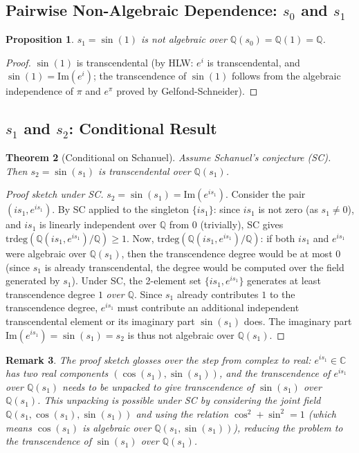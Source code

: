 \documentclass[11pt]{article}
\newtheorem{theorem}{Theorem}
\newtheorem{proposition}[theorem]{Proposition}
\newtheorem{remark}[theorem]{Remark}
\begin{document}
\subsection{Pairwise Non-Algebraic Dependence: $s_0$ and $s_1$}

\begin{proposition}
$s_1=\sin(1)$ is not algebraic over $\mathbb{Q}(s_0)=\mathbb{Q}(1)=\mathbb{Q}$.
\end{proposition}

\begin{proof}
$\sin(1)$ is transcendental (by HLW: $e^i$ is transcendental, and $\sin(1)=\mathrm{Im}(e^i)$;
the transcendence of $\sin(1)$ follows from the algebraic independence of
$\pi$ and $e^\pi$ proved by Gelfond-Schneider).
\end{proof}

\subsection{$s_1$ and $s_2$: Conditional Result}

\begin{theorem}[Conditional on Schanuel]
\label{thm:s1s2}
Assume Schanuel's conjecture (SC). Then $s_2=\sin(s_1)$ is transcendental over $\mathbb{Q}(s_1)$.
\end{theorem}

\begin{proof}[Proof sketch under SC]
$s_2=\sin(s_1)=\mathrm{Im}(e^{is_1})$.
Consider the pair $(is_1, e^{is_1})$. By SC applied to the singleton $\{is_1\}$:
since $is_1$ is not zero (as $s_1\neq0$), and $is_1$ is linearly independent over $\mathbb{Q}$
from $0$ (trivially), SC gives $\mathrm{trdeg}(\mathbb{Q}(is_1, e^{is_1})/\mathbb{Q})\geq1$.
Now, $\mathrm{trdeg}(\mathbb{Q}(is_1, e^{is_1})/\mathbb{Q})$:
if both $is_1$ and $e^{is_1}$ were algebraic over $\mathbb{Q}(s_1)$, then the transcendence
degree would be at most $0$ (since $s_1$ is already transcendental, the degree would be
computed over the field generated by $s_1$). Under SC, the 2-element set $\{is_1, e^{is_1}\}$
generates at least transcendence degree $1$ \emph{over $\mathbb{Q}$}. Since $s_1$
already contributes $1$ to the transcendence degree, $e^{is_1}$ must contribute an
additional independent transcendental element or its imaginary part $\sin(s_1)$ does.
The imaginary part $\mathrm{Im}(e^{is_1})=\sin(s_1)=s_2$ is thus not algebraic over $\mathbb{Q}(s_1)$.
\end{proof}

\begin{remark}
The proof sketch glosses over the step from complex to real: $e^{is_1}\in\mathbb{C}$
has two real components $(\cos(s_1), \sin(s_1))$, and the transcendence of $e^{is_1}$
over $\mathbb{Q}(s_1)$ needs to be unpacked to give transcendence of $\sin(s_1)$ over $\mathbb{Q}(s_1)$.
This unpacking is possible under SC by considering the joint field $\mathbb{Q}(s_1, \cos(s_1), \sin(s_1))$
and using the relation $\cos^2+\sin^2=1$ (which means $\cos(s_1)$ is algebraic over $\mathbb{Q}(s_1,\sin(s_1))$),
reducing the problem to the transcendence of $\sin(s_1)$ over $\mathbb{Q}(s_1)$.
\end{remark}
\end{document}
